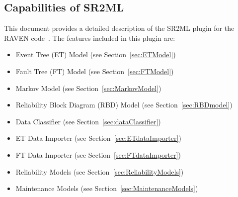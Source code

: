 \subsection{Capabilities of SR2ML}
This document provides a detailed description of the SR2ML plugin for the RAVEN code~\cite{RAVEN,RAVENtheoryMan}.
The features included in this plugin are:
\begin{itemize}
	\item Event Tree (ET) Model (see Section~\ref{sec:ETModel})
	\item Fault Tree (FT) Model (see Section~\ref{sec:FTModel})
	\item Markov Model (see Section~\ref{sec:MarkovModel})
	\item Reliability Block Diagram (RBD) Model (see Section~\ref{sec:RBDmodel})
	\item Data Classifier (see Section~\ref{sec:dataClassifier})
	\item ET Data Importer (see Section~\ref{sec:ETdataImporter})
	\item FT Data Importer (see Section~\ref{sec:FTdataImporter})
	\item Reliability Models (see Section~\ref{sec:ReliabilityModels})
  \item Maintenance Models (see Section~\ref{sec:MaintenanceModels})
\end{itemize}
